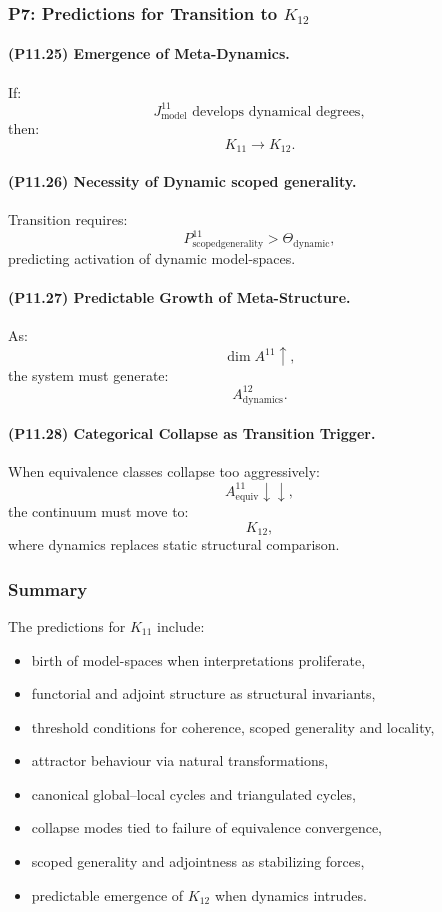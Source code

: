 \subsubsection{P7: Predictions for Transition to $K_{12}$}

\paragraph{(P11.25) Emergence of Meta-Dynamics.}
If:
\[
J_{\mathrm{model}}^{11}
\text{ develops dynamical degrees},
\]
then:
\[
K_{11} \to K_{12}.
\]

\paragraph{(P11.26) Necessity of Dynamic scoped generality.}
Transition requires:
\[
P_{\mathrm{scoped generality}}^{11}
> \Theta_{\mathrm{dynamic}},
\]
predicting activation of dynamic model-spaces.

\paragraph{(P11.27) Predictable Growth of Meta-Structure.}
As:
\[
\dim A^{11} \uparrow,
\]
the system must generate:
\[
A_{\mathrm{dynamics}}^{12}.
\]

\paragraph{(P11.28) Categorical Collapse as Transition Trigger.}
When equivalence classes collapse too aggressively:
\[
A_{\mathrm{equiv}}^{11} \downarrow \downarrow,
\]
the continuum must move to:
\[
K_{12},
\]
where dynamics replaces static structural comparison.

\subsubsection{Summary}

The predictions for $K_{11}$ include:
\begin{itemize}
    \item birth of model-spaces when interpretations proliferate,
    \item functorial and adjoint structure as structural invariants,
    \item threshold conditions for coherence, scoped generality and locality,
    \item attractor behaviour via natural transformations,
    \item canonical global–local cycles and triangulated cycles,
    \item collapse modes tied to failure of equivalence convergence,
    \item scoped generality and adjointness as stabilizing forces,
    \item predictable emergence of $K_{12}$ when dynamics intrudes.
\end{itemize}
